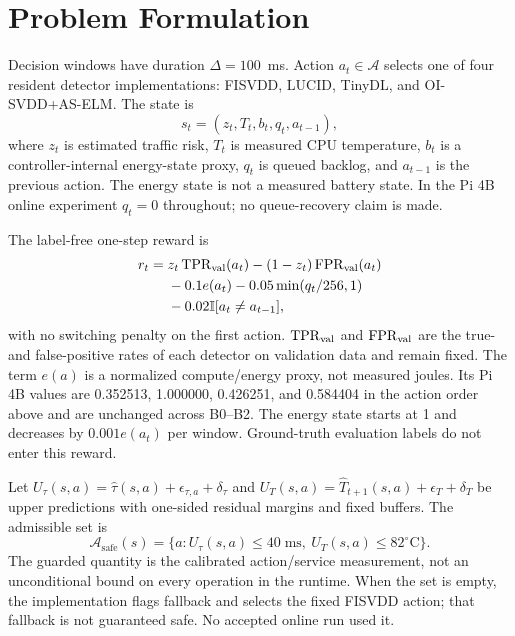 \documentclass[journal]{IEEEtran}
\newcommand{\Aset}{\mathcal{A}}
\newcommand{\Asafe}{\mathcal{A}_{\mathrm{safe}}}
\newcommand{\ind}{\mathbb{I}}
\begin{document}
\section{Problem Formulation}
Decision windows have duration $\Delta=100$~ms. Action $a_t\in\Aset$ selects one of four resident detector implementations: FISVDD, LUCID, TinyDL, and OI-SVDD+AS-ELM.
The state is
\begin{equation}
s_t=(z_t,T_t,b_t,q_t,a_{t-1}),
\label{eq:state}
\end{equation}
where $z_t$ is estimated traffic risk, $T_t$ is measured CPU temperature, $b_t$ is a controller-internal energy-state proxy, $q_t$ is queued backlog, and $a_{t-1}$ is the previous action. The energy state is not a measured battery state. In the Pi 4B online experiment $q_t=0$ throughout; no queue-recovery claim is made.

The label-free one-step reward is
\begin{equation}
\begin{split}
r_t={}&z_t\,\mathrm{TPR}_{\rm val}(a_t)-(1-z_t)\,\mathrm{FPR}_{\rm val}(a_t)\\
&-0.1e(a_t)-0.05\min(q_t/256,1)\\
&-0.02\ind[a_t\ne a_{t-1}],
\end{split}\label{eq:reward}
\end{equation}
with no switching penalty on the first action. $\mathrm{TPR}_{\rm val}$ and $\mathrm{FPR}_{\rm val}$ are the true- and false-positive rates of each detector on validation data and remain fixed. The term $e(a)$ is a normalized compute/energy proxy, not measured joules. Its Pi 4B values are 0.352513, 1.000000, 0.426251, and 0.584404 in the action order above and are unchanged across B0--B2. The energy state starts at 1 and decreases by $0.001e(a_t)$ per window.
Ground-truth evaluation labels do not enter this reward.

Let $U_\tau(s,a)=\widehat\tau(s,a)+\epsilon_{\tau,a}+\delta_\tau$ and $U_T(s,a)=\widehat T_{t+1}(s,a)+\epsilon_T+\delta_T$ be upper predictions with one-sided residual margins and fixed buffers. The admissible set is
\begin{equation}
\Asafe(s)=\{a:U_\tau(s,a)\le40\;\mathrm{ms},\ U_T(s,a)\le82^\circ\mathrm C\}.
\label{eq:safeset}
\end{equation}
The guarded quantity is the calibrated action/service measurement, not an unconditional bound on every operation in the runtime. When the set is empty, the implementation flags fallback and selects the fixed FISVDD action; that fallback is not guaranteed safe. No accepted online run used it.
\end{document}
